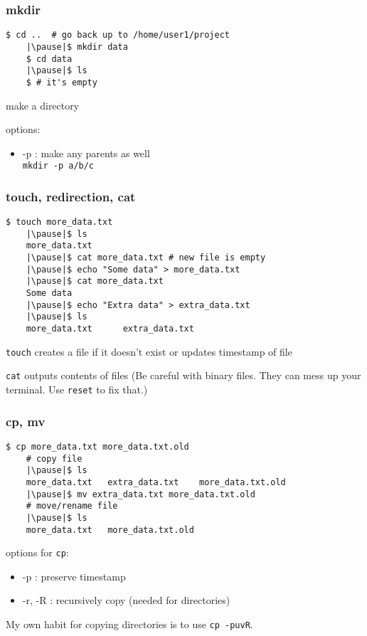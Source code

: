 \documentclass[%
        hyperref={%
                pdfauthor={Zakariyya Mughal},%
                pdfpagemode={None},pdfpagelayout={SinglePage}}%
        xcolor={x11names},%
]{beamer}
\begin{document}
\begin{frame}[fragile]
	\frametitle{mkdir}
	\begin{lstlisting}[escapeinside=||]
	$ cd ..  # go back up to /home/user1/project
	|\pause|$ mkdir data
	$ cd data
	|\pause|$ ls
	$ # it's empty
	\end{lstlisting}

	make a directory

	\pause
	options:
	\begin{itemize}
		\item -p : make any parents as well\\
			\qquad\texttt{mkdir -p a/b/c}
	\end{itemize}
\end{frame}
\begin{frame}[fragile]
	\frametitle{touch, redirection, cat}
	\begin{lstlisting}[escapeinside=||]
	$ touch more_data.txt
	|\pause|$ ls
	more_data.txt
	|\pause|$ cat more_data.txt # new file is empty
	|\pause|$ echo "Some data" > more_data.txt
	|\pause|$ cat more_data.txt
	Some data
	|\pause|$ echo "Extra data" > extra_data.txt
	|\pause|$ ls
	more_data.txt      extra_data.txt
	\end{lstlisting}

	\pause \texttt{touch} creates a file if it doesn't exist or updates timestamp of file

	\pause\texttt{cat} outputs contents of files \pause (Be careful with
	binary files. They can mess up your terminal. Use
	\texttt{reset} to fix that.)
\end{frame}
\begin{frame}[fragile]
	\frametitle{cp, mv}
	\begin{lstlisting}[escapeinside=||]
	$ cp more_data.txt more_data.txt.old
	# copy file
	|\pause|$ ls
	more_data.txt   extra_data.txt    more_data.txt.old
	|\pause|$ mv extra_data.txt more_data.txt.old
	# move/rename file
	|\pause|$ ls
	more_data.txt   more_data.txt.old
	\end{lstlisting}

	\pause
	options for \texttt{cp}:
	\begin{itemize}
		\item -p : preserve timestamp
		\item -r, -R : recursively copy (needed for directories)
	\end{itemize}

	My own habit for copying directories is to use \texttt{cp~-puvR}.
\end{frame}
\end{document}
